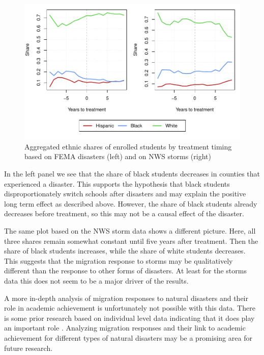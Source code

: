 \begin{figure}[!h]
	\centering
	\includegraphics[scale=1]{"../Code & Data/EthnicComposition.pdf"}
	\caption{Aggregated ethnic shares of enrolled students by treatment timing based on FEMA disasters (left) and on NWS storms (right)}
	\label{EthnicComposition}
\end{figure}

In the left panel we see that the share of black students decreases in counties that experienced a disaster. This supports the hypothesis that black students disproportionately switch schools after disasters and may explain the positive long term effect as described above. However, the share of black students already decreases before treatment, so this may not be a causal effect of the disaster.

The same plot based on the NWS storm data shows a different picture. Here, all three shares remain somewhat constant until five years after treatment. Then the share of black students increases, while the share of white students decreases. This suggests that the migration response to storms may be qualitatively different than the response to other forms of disasters. At least for the storms data this does not seem to be a major driver of the results.

A more in-depth analysis of migration responses to natural disasters and their role in academic achievement is unfortunately not possible with this data. There is some prior research based on individual level data indicating that it does play an important role \citep[for example][]{Sacerdote_2012}. Analyzing migration responses and their link to academic achievement for different types of natural disasters may be a promising area for future research.

